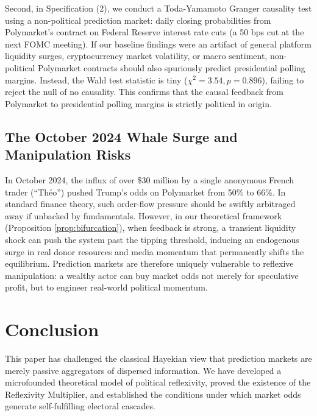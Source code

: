 \documentclass[12pt]{article}
\begin{document}
Second, in Specification (2), we conduct a Toda-Yamamoto Granger causality test using a non-political prediction market: daily closing probabilities from Polymarket's contract on Federal Reserve interest rate cuts (a 50 bps cut at the next FOMC meeting). If our baseline findings were an artifact of general platform liquidity surges, cryptocurrency market volatility, or macro sentiment, non-political Polymarket contracts should also spuriously predict presidential polling margins. Instead, the Wald test statistic is tiny ($\chi^2 = 3.54, p = 0.896$), failing to reject the null of no causality. This confirms that the causal feedback from Polymarket to presidential polling margins is strictly political in origin.

\subsection{The October 2024 Whale Surge and Manipulation Risks}
In October 2024, the influx of over \$30 million by a single anonymous French trader (``Théo'') pushed Trump's odds on Polymarket from 50\% to 66\%. In standard finance theory, such order-flow pressure should be swiftly arbitraged away if unbacked by fundamentals. However, in our theoretical framework (Proposition \ref{prop:bifurcation}), when feedback is strong, a transient liquidity shock can push the system past the tipping threshold, inducing an endogenous surge in real donor resources and media momentum that permanently shifts the equilibrium. Prediction markets are therefore uniquely vulnerable to reflexive manipulation: a wealthy actor can buy market odds not merely for speculative profit, but to engineer real-world political momentum.

\section{Conclusion}

This paper has challenged the classical Hayekian view that prediction markets are merely passive aggregators of dispersed information. We have developed a microfounded theoretical model of political reflexivity, proved the existence of the Reflexivity Multiplier, and established the conditions under which market odds generate self-fulfilling electoral cascades. 
\end{document}
